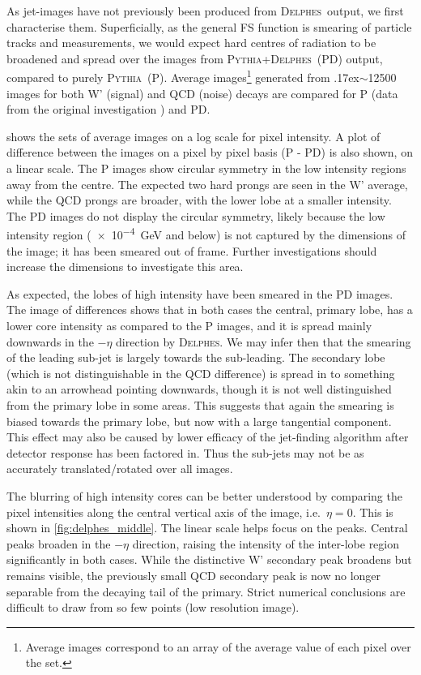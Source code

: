 \documentclass[twocolumn,twoside]{article}
\newcommand{\pkg}[1]{\textsc{#1}}
\newcommand{\pythia}{\pkg{Pythia}}
\newcommand{\delphes}{\pkg{Delphes}}
\newcommand{\around}{{\raise.17ex\hbox{$\scriptstyle\sim$}}}
\begin{document}
As jet-images have not previously been produced from \delphes~output, we first characterise them. Superficially, as the general FS function is smearing of particle tracks and measurements, we would expect hard centres of radiation to be broadened and spread over the images from \pythia+\delphes~(PD) output, compared to purely \pythia~(P). Average images\footnote{Average images correspond to an array of the average value of each pixel over the set.} generated from \around\num{12500} images for both W' (signal) and QCD (noise) decays are compared for P (data from the original investigation \cite{de2017learning}) and PD. 

 shows the sets of average images on a log scale for pixel intensity. A plot of difference between the images on a pixel by pixel basis (P - PD) is also shown, on a linear scale. The P images show circular symmetry in the low intensity regions away from the centre. The expected two hard prongs are seen in the W' average, while the QCD prongs are broader, with the lower lobe at a smaller intensity. The PD images do not display the circular symmetry, likely because the low intensity region (\SI{e-4}{\giga\electronvolt} and below) is not captured by the dimensions of the image; it has been smeared out of frame. Further investigations should increase the dimensions to investigate this area.

As expected, the lobes of high intensity have been smeared in the PD images. The image of differences shows that in both cases the central, primary lobe, has a lower core intensity as compared to the P images, and it is spread mainly downwards in the $-\eta$ direction by \delphes. We may infer then that the smearing of the leading sub-jet is largely towards the sub-leading. The secondary lobe (which is not distinguishable in the QCD difference) is spread in to something akin to an arrowhead pointing downwards, though it is not well distinguished from the primary lobe in some areas. This suggests that again the smearing is biased towards the primary lobe, but now with a large tangential component. This effect may also be caused by lower efficacy of the jet-finding algorithm after detector response has been factored in. Thus the sub-jets may not be as accurately translated/rotated over all images.

The blurring of high intensity cores can be better understood by comparing the pixel intensities along the central vertical axis of the image, i.e.~$\eta=0$. This is shown in \cref{fig:delphes_middle}. The linear scale helps focus on the peaks. Central peaks broaden in the $-\eta$ direction, raising the intensity of the inter-lobe region significantly in both cases. While the distinctive W' secondary peak broadens but remains visible, the previously small QCD secondary peak is now no longer separable from the decaying tail of the primary. Strict numerical conclusions are difficult to draw from so few points (low resolution image).
\end{document}
